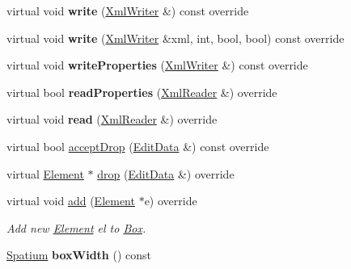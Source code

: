 \begin{DoxyCompactItemize}
\mbox{\label{class_ms_1_1_box_ae8ad7203ef4190fa6b20b65557e09fcf}} 
virtual void {\bfseries write} (\hyperlink{class_ms_1_1_xml_writer}{Xml\+Writer} \&) const override
\item 
\mbox{\label{class_ms_1_1_box_a9ae6636c08845768e8c10db88be707bb}} 
virtual void {\bfseries write} (\hyperlink{class_ms_1_1_xml_writer}{Xml\+Writer} \&xml, int, bool, bool) const override
\item 
\mbox{\label{class_ms_1_1_box_a7046d3e0199cd3dd9a38b0f481048bd0}} 
virtual void {\bfseries write\+Properties} (\hyperlink{class_ms_1_1_xml_writer}{Xml\+Writer} \&) const override
\item 
\mbox{\label{class_ms_1_1_box_a86cb72aa1ef3c3a90334e5eb40645ed8}} 
virtual bool {\bfseries read\+Properties} (\hyperlink{class_ms_1_1_xml_reader}{Xml\+Reader} \&) override
\item 
\mbox{\label{class_ms_1_1_box_afe6a7cfa65da7edff33b6f3aa188ce2e}} 
virtual void {\bfseries read} (\hyperlink{class_ms_1_1_xml_reader}{Xml\+Reader} \&) override
\item 
virtual bool \hyperlink{class_ms_1_1_box_adea5343e08360e710da1b62a55e61c28}{accept\+Drop} (\hyperlink{class_ms_1_1_edit_data}{Edit\+Data} \&) const override
\item 
virtual \hyperlink{class_ms_1_1_element}{Element} $\ast$ \hyperlink{class_ms_1_1_box_ac1ec659f101990a90822f10edccdc2e6}{drop} (\hyperlink{class_ms_1_1_edit_data}{Edit\+Data} \&) override
\item 
\mbox{\label{class_ms_1_1_box_aa1c9f1728f9b7e445bd2436ad5d8b74c}} 
virtual void \hyperlink{class_ms_1_1_box_aa1c9f1728f9b7e445bd2436ad5d8b74c}{add} (\hyperlink{class_ms_1_1_element}{Element} $\ast$e) override
\begin{DoxyCompactList}\small\item\em Add new \hyperlink{class_ms_1_1_element}{Element} {\itshape el} to \hyperlink{class_ms_1_1_box}{Box}. \end{DoxyCompactList}\item 
\mbox{\label{class_ms_1_1_box_a1069c49c9de6732a70117e7f3aa1399c}} 
\hyperlink{class_ms_1_1_spatium}{Spatium} {\bfseries box\+Width} () const

\end{DoxyCompactItemize}

